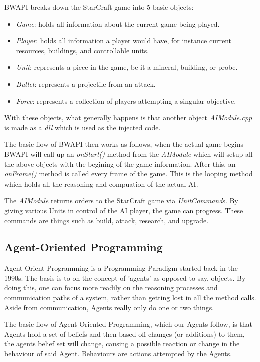 \documentclass[letterpaper]{article}
\begin{document}
BWAPI breaks down the StarCraft game into 5 basic objects: 
\begin{itemize}
\item \emph{Game}:  holds all information about the current game being played. 
\item \emph{Player}:  holds all information a player would have, for instance current resources, buildings, and controllable units.
\item \emph{Unit}: represents a piece in the game, be it a mineral, building, or probe.
\item \emph{Bullet}: represents a projectile from an attack.
\item \emph{Force}: represents a collection of players attempting a singular objective.
\end{itemize}

With these objects, what generally happens is that another object \emph{AIModule.cpp} is made as a \emph{dll} which is used as the injected code.

The basic flow of BWAPI then works as follows, when the actual game begins BWAPI will call up an \emph{onStart()} method from the \emph{AIModule} which will setup all the above objects with the begining of the game information.  After this, an \emph{onFrame()} method is called every frame of the game.  This is the looping method which holds all the reasoning and compuation of the actual AI.  

The \emph{AIModule} returns orders to the StarCraft game via \emph{UnitCommand}s.  By giving various Units in control of the AI player, the game can progress.  These commands are things such as build, attack, research, and upgrade. 


\subsection{Agent-Oriented Programming}
Agent-Orient Programming is a Programming Paradigm started back in the 1990s.  The basis is to on the concept of 'agents' as opposed to say, objects.  By doing this, one can focus more readily on the reasoning processes and communication paths of a system, rather than getting lost in all the method calls.  Aside from communication, Agents really only do one or two things.  

The basic flow of Agent-Oriented Programming, which our Agents follow, is that Agents hold a set of beliefs and then based off changes (or additions) to them, the agents belief set will change, causing a possible reaction or change in the behaviour of said Agent.  Behaviours are actions attempted by the Agents.
\end{document}
